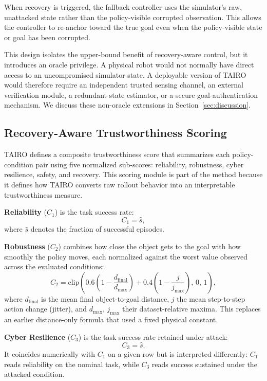 \documentclass[conference]{IEEEtran}
\begin{document}
When recovery is triggered, the fallback controller uses the simulator's raw,
unattacked state rather than the policy-visible corrupted observation. This allows the
controller to re-anchor toward the true goal even when the policy-visible state or goal
has been corrupted.

This design isolates the upper-bound benefit of recovery-aware control, but it introduces
an oracle privilege. A physical robot would not normally have direct access to an
uncompromised simulator state. A deployable version of TAIRO would therefore require an
independent trusted sensing channel, an external verification module, a redundant state
estimator, or a secure goal-authentication mechanism. We discuss these non-oracle
extensions in Section~\ref{sec:discussion}.

\subsection{Recovery-Aware Trustworthiness Scoring}

TAIRO defines a composite trustworthiness score that summarizes each policy-condition
pair using five normalized sub-scores: reliability, robustness, cyber resilience,
safety, and recovery. This scoring module is part of the method because it defines
how TAIRO converts raw rollout behavior into an interpretable trustworthiness measure.

\textbf{Reliability} ($C_1$) is the task success rate:
\[
C_1 = \hat{s},
\]
where $\hat{s}$ denotes the fraction of successful episodes.

\textbf{Robustness} ($C_2$) combines how close the object gets to the goal with how
smoothly the policy moves, each normalized against the worst value observed across the
evaluated conditions:
\[
C_2 = \mathrm{clip}\!\left(
0.6\left(1-\frac{d_{\mathrm{final}}}{d_{\max}}\right) +
0.4\left(1-\frac{j}{j_{\max}}\right),\, 0,\, 1\right),
\]
where $d_{\mathrm{final}}$ is the mean final object-to-goal distance, $j$ the mean
step-to-step action change (jitter), and $d_{\max},\,j_{\max}$ their dataset-relative
maxima. This replaces an earlier distance-only formula that used a fixed physical
constant.

\textbf{Cyber Resilience} ($C_3$) is the task success rate retained under attack:
\[
C_3 = \hat{s}.
\]
It coincides numerically with $C_1$ on a given row but is interpreted differently:
$C_1$ reads reliability on the nominal task, while $C_3$ reads success sustained under
the attacked condition.
\end{document}
